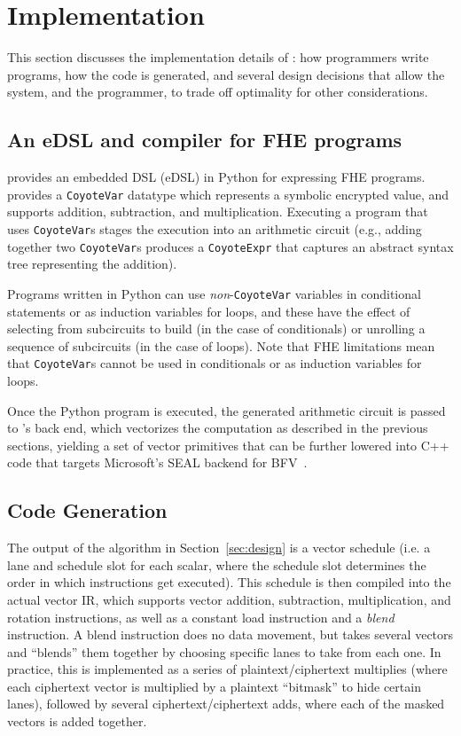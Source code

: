 \section{Implementation}\label{sec:implementation}

This section discusses the implementation details of \system: how programmers write \system programs, how the code is generated, and several design decisions that allow the system, and the programmer, to trade off optimality for other considerations.

\subsection{An eDSL and compiler for FHE programs}
\system provides an embedded DSL (eDSL) in Python for expressing FHE programs. \system provides a \texttt{CoyoteVar} datatype which represents a symbolic encrypted value, and supports addition, subtraction, and multiplication. Executing a program that uses \texttt{CoyoteVar}s stages the execution into an arithmetic circuit (e.g., adding together two \texttt{CoyoteVar}s produces a \texttt{CoyoteExpr} that captures an abstract syntax tree representing the addition). 

Programs written in Python can use {\em non}-{\tt CoyoteVar} variables in conditional statements or as induction variables for loops, and these have the effect of selecting from subcircuits to build (in the case of conditionals) or unrolling a sequence of subcircuits (in the case of loops). Note that FHE limitations mean that {\tt CoyoteVar}s cannot be used in conditionals or as induction variables for loops.

Once the Python program is executed, the generated arithmetic circuit is passed to \system's back end, which vectorizes the computation as described in the previous sections, yielding a set of vector primitives that can be further lowered into C++ code that targets Microsoft's SEAL backend for BFV~\cite{seal}.



\subsection{Code Generation}\label{sec:codegen}
The output of the algorithm in Section~\ref{sec:design} is a vector schedule (i.e. a lane and schedule slot for each scalar, where the schedule slot determines the order in which instructions get executed).
This schedule is then compiled into the actual vector IR, which supports vector addition, subtraction, multiplication, and rotation instructions, as well as a constant load instruction and a {\em blend} instruction.
A blend instruction does no data movement, but takes several vectors and ``blends'' them together by choosing specific lanes to take from each one.
In practice, this is implemented as a series of plaintext/ciphertext multiplies (where each ciphertext vector is multiplied by a plaintext ``bitmask'' to hide certain lanes), followed by several ciphertext/ciphertext adds, where each of the masked vectors is added together.

